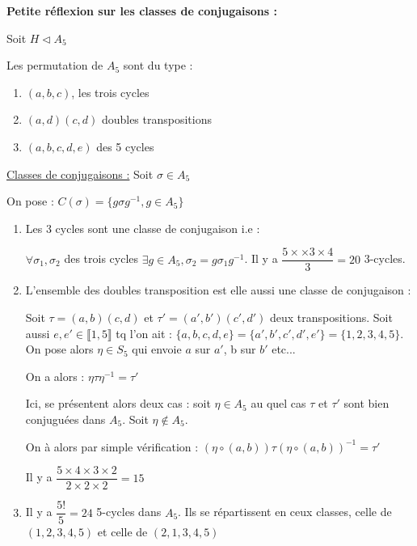 \documentclass{report}
\begin{document}
\begin{tcolorbox}[colframe = white]
\textbf{Petite réflexion sur les classes de conjugaisons :}\par
Soit $H\triangleleft A_{5}$\par

Les permutation de $A_{5}$ sont du type :
\begin{enumerate}

	\item $(a,b,c)$, les trois cycles
	\item $(a,d)(c,d)$ doubles transpositions
	\item $(a,b,c,d,e)$ des 5 cycles

\end{enumerate}

\underline{Classes de conjugaisons :} Soit $\sigma \in A_{5}$\par
On pose : $C(\sigma) = \{g\sigma g^{-1}, g\in A_{5}\}$\par 

\begin{enumerate}

\item Les 3 cycles sont une classe de conjugaison i.e :\par 
	$\forall \sigma_{1},\sigma_{2}$ des trois cycles $\exists g \in A_{5}, \sigma_{2}= g\sigma_{1} g^{-1}$. Il y a $\dfrac{5\times \times 3 \times 4}{3}=20$ 3-cycles.
	
\item L'ensemble des doubles transposition est elle aussi une classe de conjugaison :\par
Soit $\tau  = (a,b)(c,d)$ et $\tau ' = (a',b')(c',d')$ deux transpositions. Soit aussi $e,e'\in \llbracket 1,5\rrbracket$ tq l'on ait : $\{a,b,c,d,e\} = \{a',b',c',d',e'\} = \{1,2,3,4,5\}$. On pose alors $\eta \in S_{5}$ qui envoie $a$ sur $a'$, b sur $b'$ etc...\par 
On a alors : $\eta\tau\eta^{-1} = \tau'$\par
Ici, se présentent alors deux cas : soit $\eta \in A_{5}$ au quel cas $\tau$ et $\tau'$ sont bien conjuguées dans $A_{5}$. Soit $\eta \notin A_{5}$.\par On à alors par simple vérification : $(\eta\circ (a,b))\tau(\eta\circ(a,b))^{-1} = \tau'$\par 
Il y a $\dfrac{5\times 4 \times 3 \times 2}{2\times 2 \times 2} = 15$


\item  Il y a $\dfrac{5!}{5} = 24$ 5-cycles dans $A_{5}$. Ils se répartissent en ceux classes, celle de $(1,2,3,4,5)$ et celle de $(2,1,3,4,5)$
\end{enumerate} 

\end{tcolorbox}
\end{document}
